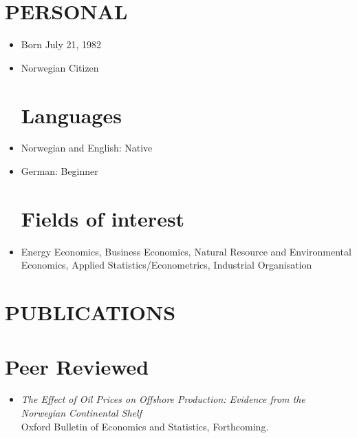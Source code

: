 \documentclass[margin]{res}
\begin{document}
  

\address{BI Campus Trondheim \\Postboks 1254, Sluppen
7462 Trondheim \\ mob:  +47 98 25 16 75 \\ email: johannes.mauritzen@bi.no \\
website:  \url{jmaurit.github.io}}
                           
                        
\begin{resume} 
\section{PERSONAL}
\begin{itemize} 
\item[] Born July 21, 1982
\item[] Norwegian Citizen

\normalsize{\section{Languages}}
\item[] Norwegian and English: Native
\item[] German: Beginner 

\normalsize{\section{Fields of interest}}
\item[] Energy Economics, Business Economics, Natural Resource and Environmental Economics, Applied Statistics/Econometrics, Industrial Organisation
\end{itemize}


\section{PUBLICATIONS}       

\normalsize{\section{Peer Reviewed}}
\begin{itemize}
\setlength{\itemsep}{10pt}
\item[] \emph{The Effect of Oil Prices on Offshore Production: Evidence from the Norwegian Continental Shelf}\\
Oxford Bulletin of Economics and Statistics, Forthcoming. 


\end{itemize}
\end{resume}
\end{document}
